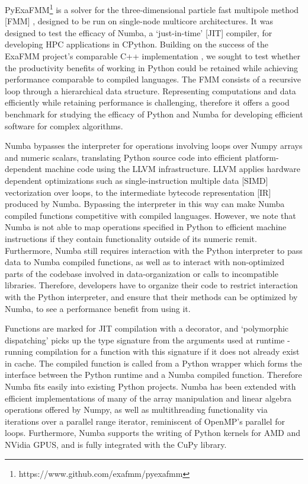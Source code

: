 \documentclass{IEEEcsmag}
\begin{document}
PyExaFMM\footnote{https://www.github.com/exafmm/pyexafmm} is a solver for the three-dimensional particle fast multipole method [FMM] \cite{Greengard1987}, designed to be run on single-node multicore architectures. It was designed to test the efficacy of Numba, a `just-in-time' [JIT] compiler, for developing HPC applications in CPython. Building on the success of the ExaFMM project's comparable C++ implementation \cite{Wang2021}, we sought to test whether the productivity benefits of working in Python could be retained while achieving performance comparable to compiled languages.  The FMM consists of a recursive loop through a hierarchical data structure. Representing computations and data efficiently while retaining performance is challenging, therefore it offers a good benchmark for studying the efficacy of Python and Numba for developing efficient software for complex algorithms.

Numba bypasses the interpreter for operations involving loops over Numpy arrays and numeric scalars, translating Python source code into efficient platform-dependent machine code using the LLVM infrastructure. LLVM applies hardware dependent optimizations such as single-instruction multiple data [SIMD] vectorization over loops, to the intermediate bytecode representation [IR] produced by Numba. Bypassing the interpreter in this way can make Numba compiled functions competitive with compiled languages. However, we note that Numba is not able to map operations specified in Python to efficient machine instructions if they contain functionality outside of its numeric remit. Furthermore, Numba still requires interaction with the Python interpreter to pass data to Numba compiled functions, as well as to interact with non-optimized parts of the codebase involved in data-organization or calls to incompatible libraries. Therefore, developers have to organize their code to restrict interaction with the Python interpreter, and ensure that their methods can be optimized by Numba, to see a performance benefit from using it.

Functions are marked for JIT compilation with a decorator, and `polymorphic dispatching' picks up the type signature from the arguments used at runtime - running compilation for a function with this signature if it does not already exist in cache. The compiled function is called from a Python wrapper which forms the interface between the Python runtime and a Numba compiled function. Therefore Numba fits easily into existing Python projects. Numba has been extended with efficient implementations of many of the array manipulation and linear algebra operations offered by Numpy, as well as multithreading functionality via iterations over a parallel range iterator, reminiscent of OpenMP's parallel for loops. Furthermore, Numba supports the writing of Python kernels for AMD and NVidia GPUS, and is fully integrated with the CuPy library.
\end{document}
